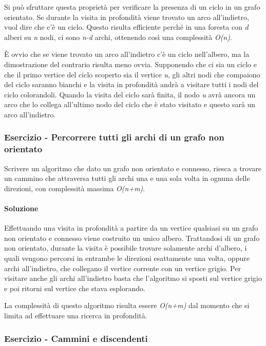 Si può sfruttare questa proprietà per verificare la presenza di un ciclo
in un grafo orientato. Se durante la visita in profondità viene trovato
un arco all'indietro, vuol dire che c'è un ciclo. Questo risulta
efficiente perché in una foresta con \emph{d} alberi su \emph{n} nodi,
ci sono \emph{n-d} archi, ottenendo così una complessità \emph{O(n)}.

È ovvio che se viene trovato un arco all'indietro c'è un ciclo
nell'albero, ma la dimostrazione del contrario risulta meno ovvia.
Supponendo che ci sia un ciclo e che il primo vertice del ciclo scoperto
sia il vertice \emph{u}, gli altri nodi che compaiono del ciclo saranno bianchi e la visita in profondità andrà a visitare tutti i nodi
del ciclo colorandoli. Quando la visita del ciclo sarà finita, il nodo
\emph{u} avrà ancora un arco che lo collega all'ultimo nodo del ciclo
che è stato visitato e questo sarà un arco all'indietro.

\subsubsection{Esercizio - Percorrere tutti gli archi di un grafo non orientato}

Scrivere un algoritmo che dato un grafo non orientato e connesso, riesca a trovare un cammino che attraversa tutti gli archi una e una sola volta in ognuna delle direzioni, con complessità massima \textit{O(n+m)}.

\paragraph{Soluzione} Effettuando una visita in profondità a partire da un vertice qualsiasi su un grafo non orientato e connesso viene costruito un unico albero.
Trattandosi di un grafo non orientato, durante la visita è possibile trovare solamente archi d'albero, i quali vengono percorsi in entrambe le direzioni esattamente una volta, oppure archi all'indietro, che collegano il vertice corrente con un vertice grigio.
Per visitare anche gli archi all'indietro basta che l'algoritmo si sposti sul vertice grigio e poi ritorni sul vertice che stava esplorando.

La complessità di questo algoritmo risulta essere \textit{O(n+m)} dal momento che si limita ad effettuare una ricerca in profondità.

\subsubsection{Esercizio - Cammini e discendenti}

